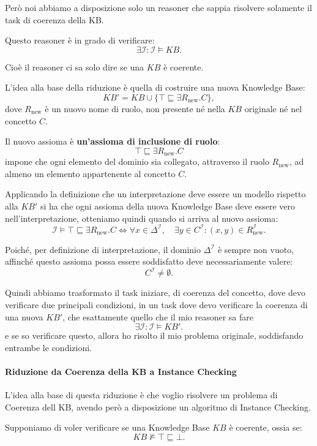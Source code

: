Però noi abbiamo a disposizione solo un reasoner che sappia risolvere solamente il task di coerenza della KB.

Questo reasoner è in grado di verificare:
\[
\exists\mathcal I:\mathcal I\models KB.
\]

Cioè il reasoner ci sa solo dire se una $KB$ è coerente.

L'idea alla base della riduzione è quella di costruire una nuova Knowledge Base:
\[
    KB' = KB \cup
    \{\top \sqsubseteq \exists R_{\mathrm{new}}.C\},
\]
dove $R_{\mathrm{new}}$ è un nuovo nome di ruolo, non presente
né nella $KB$ originale né nel concetto $C$.

Il nuovo assioma è \textbf{un'assioma di inclusione di ruolo}:
\[
    \top \sqsubseteq \exists R_{\mathrm{new}}.C
\]
impone che ogni elemento del dominio sia collegato, attraverso
il ruolo $R_{\mathrm{new}}$, ad almeno un elemento appartenente
al concetto $C$.

Applicando la definizione che un interpretazione deve essere un modello rispetto alla $KB'$ si ha che ogni assioma della nuova Knowledge Base deve essere vero nell'interpretazione, otteniamo quindi quando si arriva al nuovo assioma:
\[
    \mathcal{I} \models
    \top \sqsubseteq \exists R_{\mathrm{new}}.C
    \iff
    \forall x \in \Delta^{\mathcal{I}}, \quad
    \exists y \in C^{\mathcal{I}} :
    (x,y) \in R_{\mathrm{new}}^{\mathcal{I}}.
\]

Poiché, per definizione di interpretazione, il dominio
$\Delta^{\mathcal{I}}$ è sempre non vuoto, affinché questo
assioma possa essere soddisfatto deve necessariamente valere:
\[
    C^{\mathcal{I}} \neq \emptyset.
\]

Quindi abbiamo trasformato il task iniziare, di coerenza del concetto, dove devo verificare due principali condizioni, in un task dove devo verificare la coerenza di una nuova $KB'$, che esattamente quello che il mio reasoner sa fare
\[
\exists\mathcal I:\mathcal I\models KB'.
\]
e se so verificare questo, allora ho risolto il mio problema originale, soddisfando entrambe le condizioni.

\newpage
\paragraph{Riduzione da Coerenza della KB a Instance Checking}
L'idea alla base di questa riduzione è che voglio risolvere un problema di Coerenza dell KB, avendo però a disposizione un algoritmo
di Instance Checking.

Supponiamo di voler verificare se una Knowledge Base $KB$
è coerente, ossia se:
\[
    KB \not\models \top \sqsubseteq \bot.
\]

